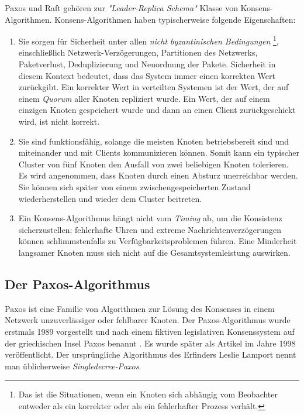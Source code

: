 Paxos \cite{Lamport98thepart-time} und Raft \cite{Ongaro14insearch} gehören zur \textit{"Leader-Replica Schema"} Klasse von Konsens-Algorithmen. Konsens-Algorithmen haben typischerweise folgende Eigenschaften:

\begin{enumerate}
	\item Sie sorgen für Sicherheit unter allen \textit{nicht byzantinischen Bedingungen} \footnote{Das ist die Situationen, wenn ein Knoten sich abhängig vom Beobachter entweder als ein korrekter oder als ein fehlerhafter Prozess verhält.}, einschließlich Netzwerk-Verzögerungen, Partitionen des Netzwerks, Paketverlust, Deduplizierung und Neuordnung der Pakete. Sicherheit in diesem Kontext bedeutet, dass das System immer einen korrekten Wert zurückgibt. Ein korrekter Wert in verteilten Systemen ist der Wert, der auf einem \textit{Quorum} aller Knoten repliziert wurde. Ein Wert, der auf einem einzigen Knoten gespeichert wurde und dann an einen Client zurückgeschickt wird, ist nicht korrekt.
	
	\item Sie sind funktionsfähig, solange die meisten Knoten betriebsbereit sind und miteinander und mit Clients kommunizieren können. Somit kann ein typischer Cluster von fünf Knoten den Ausfall von zwei beliebigen Knoten tolerieren. Es wird angenommen, dass Knoten durch einen Absturz unerreichbar werden. Sie können sich später von einem zwischengespeicherten Zustand wiederherstellen und wieder dem Cluster beitreten.
	
	\item Ein Konsens-Algorithmus hängt nicht vom \textit{Timing} ab, um die Konsistenz sicherzustellen: fehlerhafte Uhren und extreme Nachrichtenverzögerungen können schlimmstenfalls zu Verfügbarkeitsproblemen führen. Eine Minderheit langsamer Knoten muss sich nicht auf die Gesamtsystemleistung auswirken.
\end{enumerate}

\subsection{Der Paxos-Algorithmus}

Paxos ist eine Familie von Algorithmen zur Lösung des Konsenses in einem Netzwerk unzuverlässiger oder fehlbarer Knoten. Der Paxos-Algorithmus wurde erstmals 1989 vorgestellt und nach einem fiktiven legislativen Konsenssystem auf der griechischen Insel Paxos benannt \cite{Lamport98thepart-time}. Es wurde später als Artikel im Jahre 1998 veröffentlicht. Der ursprüngliche Algorithmus des Erfinders Leslie Lamport nennt man üblicherweise \textit{Singledecree-Paxos}.

